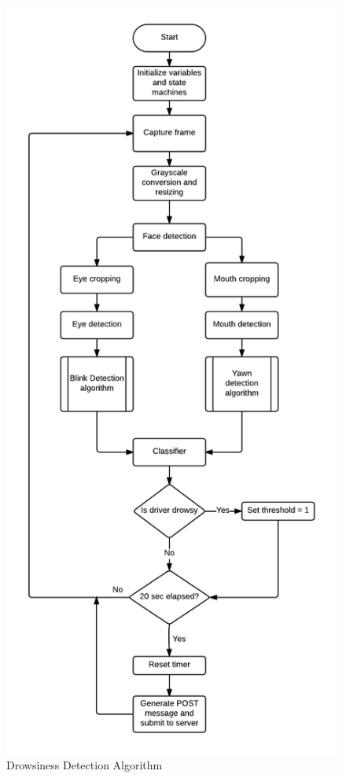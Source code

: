 \documentclass[twocolumn]{article}
\begin{document}
\begin{figure}
\centering
\includegraphics[width=0.95\linewidth]{./flowchart_detection.png}
\caption{Drowsiness Detection Algorithm }
\label{fig:drowsy_algo}
\end{figure}
\end{document}
